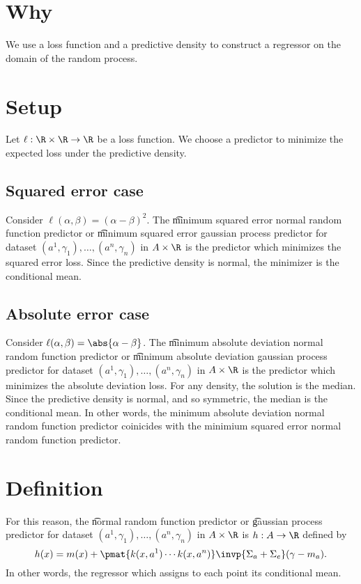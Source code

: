 
\section*{Why}

We use a loss function and a predictive density to construct a regressor on the domain of the random process.

\section*{Setup}

Let $\ell : \R  \times \R  \to \R $ be a loss function.
We choose a predictor to minimize the expected loss under the predictive density.

\subsection*{Squared error case}

Consider $\ell (\alpha , \beta ) = (\alpha  - \beta )^2$.
The \t{minimum squared error normal random function predictor} or \t{minimum squared error gaussian process predictor} for dataset $(a^1, \gamma _1), \dots , (a^n, \gamma _n)$ in $A \times \R $ is the predictor which minimizes the squared error loss.
Since the predictive density is normal, the minimizer is the conditional mean.

\subsection*{Absolute error case}

Consider $\ell (\alpha , \beta ) = \abs{\alpha  - \beta }$.
The \t{minimum absolute deviation normal random function predictor} or \t{minimum absolute deviation gaussian process predictor} for dataset $(a^1, \gamma _1), \dots , (a^n, \gamma _n)$ in $A \times \R $ is the predictor which minimizes the absolute deviation loss.
For any density, the solution is the median.
Since the predictive density is normal, and so symmetric, the median is the conditional mean.
In other words, the minimum absolute deviation normal random function predictor coinicides with the minimium squared error normal random function predictor.

\section*{Definition}

For this reason, the \t{normal random function predictor} or \t{gaussian process predictor} for dataset $(a^1, \gamma _1), \dots , (a^n, \gamma _n)$ in $A \times \R $ is $h: A \to \R $ defined by
\[
h(x) = m(x) + \pmat{k(x,a^1) \cdots k(x, a^n)}\invp{\Sigma _{a} + \Sigma _{e}}(\gamma  - m_{a}).
\]
In other words, the regressor which assigns to each point its conditional mean.

